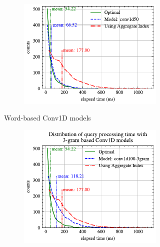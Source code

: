 \begin{figure}[!h]
\begin{subfigure}{0.45\textwidth}
\begin{subfigure}{\textwidth}
			\includegraphics[]{my/graphics/perf_dist_conv1d50_B.pdf}
		\end{subfigure}
		\caption{Word-based Conv1D models}
	\end{subfigure}
	\hfill
	\begin{subfigure}{0.45\textwidth}
		\begin{subfigure}{\textwidth}
			\centering
			\includegraphics[]{my/graphics/perf_dist_conv1d100_3gram_B.pdf}
		\end{subfigure}
		\vfill
		\begin{subfigure}{\textwidth}
			\centering

\end{subfigure}
\end{subfigure}
\end{figure}
